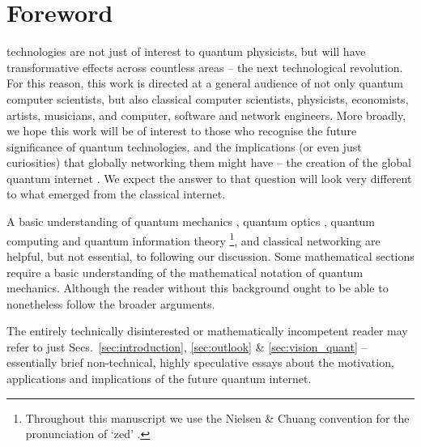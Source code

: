 %
%

\newline \newline
{}
\newline \newline
{}

\section{Foreword}\label{sec:foreword}

 technologies are not just of interest to quantum physicists, but will have transformative effects across countless areas -- the next technological revolution. For this reason, this work is directed at a general audience of not only quantum computer scientists, but also classical computer scientists, physicists, economists, artists, musicians, and computer, software and network engineers. More broadly, we hope this work will be of interest to those who recognise the future significance of quantum technologies, and the implications (or even just curiosities) that globally networking them might have -- the creation of the global quantum internet \cite{bib:van2014quantum, bib:Kimble2008}. We expect the answer to that question will look very different to what emerged from the classical internet.

A basic understanding of quantum mechanics \cite{bib:Sakurai94}, quantum optics \cite{bib:GerryKnight05}, quantum computing and quantum information theory \cite{bib:NielsenChuang00}\footnote{Throughout this manuscript we use the Nielsen \& Chuang convention for the pronunciation of `zed' \cite{bib:NielsenChuang00}.}, and classical networking \cite{bib:TanenbaumNet} are helpful, but not essential, to following our discussion. Some mathematical sections require a basic understanding of the mathematical notation of quantum mechanics. Although the reader without this background ought to be able to nonetheless follow the broader arguments.

The entirely technically disinterested or mathematically incompetent reader may refer to just Secs.~\ref{sec:introduction}, \ref{sec:outlook} \& \ref{sec:vision_quant} -- essentially brief non-technical, highly speculative essays about the motivation, applications and implications of the future quantum internet.

